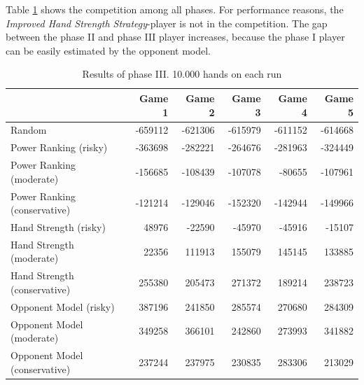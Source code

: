 Table \ref{tbl:resultsPhase3b} shows the competition among all phases. For performance reasons, the \emph{Improved Hand Strength Strategy}-player is not in the competition. The gap between the phase II and phase III player increases, because the phase I player can be easily estimated by the opponent model.
\begin{table}[h]
	\centering
	\begin{tabular}[h]{l|r|r|r|r|r}
		& \textbf{Game 1} & \textbf{Game 2} & \textbf{Game 3} & \textbf{Game 4} & \textbf{Game 5}\\
		\hline
		Random  & -659112 & -621306 & -615979 & -611152 & -614668\\
		Power Ranking (risky) & -363698 & -282221 & -264676 & -281963 & -324449\\
		Power Ranking (moderate) & -156685 & -108439 & -107078 & -80655 & -107961\\
		Power Ranking (conservative) & -121214 & -129046 & -152320 & -142944 & -149966\\
		Hand Strength (risky) & 48976 & -22590 & -45970 & -45916 & -15107\\
		Hand Strength (moderate) & 22356 & 111913 & 155079 & 145145 & 133885\\
		Hand Strength (conservative) & 255380 & 205473 & 271372 & 189214 & 238723\\
		Opponent Model (risky) & 387196 & 241850 & 285574 & 270680 & 284309\\
		Opponent Model (moderate) & 349258 & 366101 & 242860 & 273993 & 341882\\
		Opponent Model (conservative) & 237244 & 237975 & 230835 & 283306 & 213029\\
	\end{tabular}
	\caption{Results of phase III. 10.000 hands on each run}
	\label{tbl:resultsPhase3b}
\end{table}

